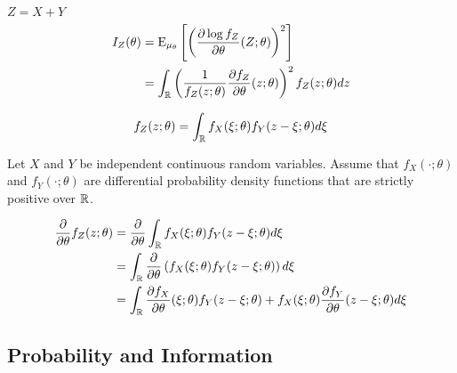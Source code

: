 \newpage
$Z = X + Y$
\begin{equation*}
\begin{split}
I_Z (\theta)
&= \mathrm{E}_{\mu_{\theta}} \left[ \left( \frac{\partial \log f_Z}{\partial \theta} (Z; \theta) \right)^2 \right] \\
&= \int_{\mathbb{R}} \left( \frac{1}{f_Z (z; \theta)} \frac{\partial f_Z}{\partial \theta} (z; \theta) \right)^2 f_Z (z; \theta) dz
\end{split}
\end{equation*}

\begin{equation*}
f_Z (z; \theta) = \int_{\mathbb{R}} f_X (\xi; \theta) f_Y (z - \xi; \theta) d\xi
\end{equation*}

\begin{theorem}
Let $X$ and $Y$ be independent continuous random variables.
Assume that $f_X(\cdot; \theta)$ and $f_Y(\cdot; \theta)$ are differential probability density functions that are strictly positive over $\mathbb{R}$.
\end{theorem}

\begin{equation*}
\begin{split}
\frac{\partial}{\partial \theta} f_Z (z; \theta)
&= \frac{\partial}{\partial \theta} \int_{\mathbb{R}} f_X (\xi; \theta) f_Y (z - \xi; \theta) d\xi \\
&= \int_{\mathbb{R}} \frac{\partial}{\partial \theta}
\left( f_X (\xi; \theta) f_Y (z - \xi; \theta) \right) d\xi \\
&= \int_{\mathbb{R}}
\frac{\partial f_X}{\partial \theta} (\xi; \theta) f_Y (z - \xi; \theta)
+ f_X (\xi; \theta) \frac{\partial f_Y}{\partial \theta} (z - \xi; \theta) d\xi \\
\end{split}
\end{equation*}


\newpage

\subsection{Probability and Information}


